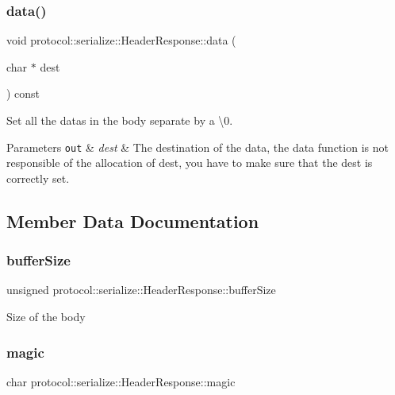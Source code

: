\subsubsection{\texorpdfstring{data()}{data()}}
{\footnotesize\ttfamily void protocol\+::serialize\+::\+Header\+Response\+::data (\begin{DoxyParamCaption}\item[{char $\ast$}]{dest }\end{DoxyParamCaption}) const}



Set all the datas in the body separate by a \textbackslash{}0. 


\begin{DoxyParams}[1]{Parameters}
\mbox{\tt out}  & {\em dest} & The destination of the data, the data function is not responsible of the allocation of dest, you have to make sure that the dest is correctly set. \\
\hline
\end{DoxyParams}


\subsection{Member Data Documentation}
\mbox{\label{structprotocol_1_1serialize_1_1_header_response_a30b58c44566a0125f58e6e7ca4ebaf11}} 
\subsubsection{\texorpdfstring{buffer\+Size}{bufferSize}}
{\footnotesize\ttfamily unsigned protocol\+::serialize\+::\+Header\+Response\+::buffer\+Size}

Size of the body \mbox{\label{structprotocol_1_1serialize_1_1_header_response_adcf0f736dcd6535a49c4373cccb146a1}} 
\subsubsection{\texorpdfstring{magic}{magic}}
{\footnotesize\ttfamily char protocol\+::serialize\+::\+Header\+Response\+::magic}

